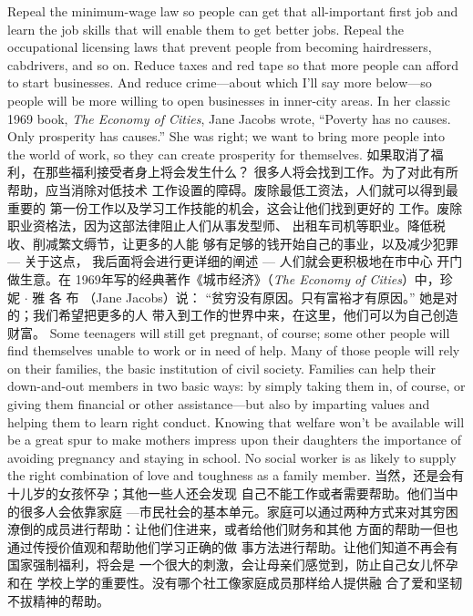 \begin{paracol}{2}
Repeal the minimum-wage law so people can get that all-important first job and learn the job skills that will enable them to
get better jobs. Repeal the occupational licensing laws that prevent people from becoming hairdressers, cabdrivers, and so on.
Reduce taxes and red tape so that more people can afford to
start businesses. And reduce crime---about which I'll say more
below---so people will be more willing to open businesses in
inner-city areas. In her classic 1969 book, \textit{The Economy of Cities},
Jane Jacobs wrote, ``Poverty has no causes. Only prosperity has
causes.'' She was right; we want to bring more people into the
world of work, so they can create prosperity for themselves.
\switchcolumn
如果取消了福利，在那些福利接受者身上将会发生什么？
很多人将会找到工作。为了对此有所帮助，应当消除对低技术
工作设置的障碍。废除最低工资法，人们就可以得到最重要的
第一份工作以及学习工作技能的机会，这会让他们找到更好的
工作。废除职业资格法，因为这部法律阻止人们从事发型师、
出租车司机等职业。降低税收、削减繁文缛节，让更多的人能
够有足够的钱开始自己的事业，以及减少犯罪 --- 关于这点，
我后面将会进行更详细的阐述 --- 人们就会更积极地在市中心
开门做生意。在 1969年写的经典著作《城市经济》（\textit{The Econ­omy of Cities}）中，珍 妮 $\cdot$ 雅 各 布 （Jane  Jacobs）说： “贫穷没有原因。只有富裕才有原因。” 她是对的；我们希望把更多的人
带入到工作的世界中来，在这里，他们可以为自己创造财富。
\switchcolumn*
Some teenagers will still get pregnant, of course; some other
people will find themselves unable to work or in need of help.
Many of those people will rely on their families, the basic institution of civil society. Families can help their down-and-out
members in two basic ways: by simply taking them in, of
course, or giving them financial or other assistance---but also
by imparting values and helping them to learn right conduct.
Knowing that welfare won't be available will be a great spur to
make mothers impress upon their daughters the importance of
avoiding pregnancy and staying in school. No social worker is
as likely to supply the right combination of love and toughness
as a family member.
\switchcolumn
当然，还是会有十儿岁的女孩怀孕；其他一些人还会发现
自己不能工作或者需要帮助。他们当中的很多人会依靠家庭
---市民社会的基本单元。家庭可以通过两种方式来对其穷困潦倒的成员进行帮助：让他们住进来，或者给他们财务和其他
方面的帮助一但也通过传授价值观和帮助他们学习正确的做
事方法进行帮助。让他们知道不再会有国家强制福利，将会是
一个很大的刺激，会让母亲们感觉到，防止自己女儿怀孕和在
学校上学的重要性。没有哪个社工像家庭成员那样给人提供融
合了爱和坚韧不拔精神的帮助。
\switchcolumn*

\end{paracol}
